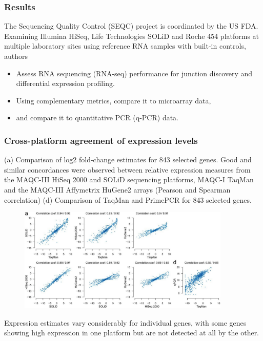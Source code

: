 \documentclass{beamer}
\begin{document}
\begin{frame}
\frametitle{Results}
The Sequencing Quality Control (SEQC) project is coordinated by the US FDA. 
Examining Illumina HiSeq, Life Technologies SOLiD and Roche 454 platforms at multiple laboratory sites using reference RNA samples with built-in controls, authors
\begin{itemize}
\item Assess RNA sequencing (RNA-seq) performance for junction discovery and differential expression profiling.\pause 
\item Using complementary metrics, compare it to microarray data, \pause
\item and compare it to quantitative PCR (q-PCR) data.
\end{itemize} 
\end{frame}

\begin{frame}
\frametitle{Cross-platform agreement of expression levels}

(a) Comparison of log2 fold-change estimates for 843 selected genes. Good and similar concordances were observed between relative expression measures from the MAQC-III HiSeq 2000 and SOLiD sequencing platforms, MAQC-I TaqMan and the MAQC-III Affymetrix HuGene2 arrays (Pearson and Spearman correlation)
\vspace{0.3cm}
(d) Comparison of TaqMan and PrimePCR for 843 selected genes.
\end{frame}

\begin{frame}
\begin{figure}[h!]
\centerline{
\includegraphics[width=0.9\textwidth]{table2.png}}
\label{fig:1}       
\end{figure}
\pause Expression estimates vary considerably for individual genes, with some genes showing high expression in one platform but are not detected at all by the other.
\end{frame}
\end{document}
